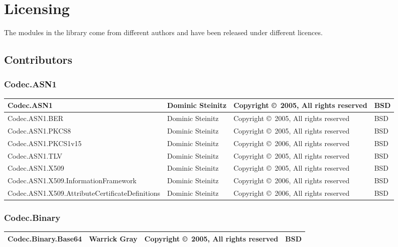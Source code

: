 \documentclass{article}
\begin{document}
\section{Licensing}

The modules in the library come from different authors and have been 
released under different licences. 

\subsection{Contributors}

\subsubsection{Codec.ASN1}
\begin{tabular}{|p{6cm}|p{3cm}|p{3cm}|p{1cm}|}
\hline\hline
Codec.ASN1 & Dominic Steinitz & 
Copyright \copyright\ 2005, All rights reserved & BSD \\
\hline
Codec.ASN1.BER & Dominic Steinitz & 
Copyright \copyright\ 2005, All rights reserved & BSD \\
\hline
Codec.ASN1.PKCS8 & Dominic Steinitz & 
Copyright \copyright\ 2005, All rights reserved & BSD \\
\hline
Codec.ASN1.PKCS1v15 & Dominic Steinitz & 
Copyright \copyright\ 2006, All rights reserved & BSD \\
\hline
Codec.ASN1.TLV & Dominic Steinitz & 
Copyright \copyright\ 2005, All rights reserved & BSD \\
\hline
Codec.ASN1.X509 & Dominic Steinitz & 
Copyright \copyright\ 2005, All rights reserved & BSD \\
\hline
Codec.ASN1.X509.Information\-Framework
& Dominic Steinitz &
Copyright \copyright\ 2006, All rights reserved & BSD \\
\hline
Codec.ASN1.X509.Attribute\-Certificate\-Definitions
& Dominic Steinitz &
Copyright \copyright\ 2006, All rights reserved & BSD \\
\hline\hline
\end{tabular}

\subsubsection{Codec.Binary}
\begin{tabular}{|p{6cm}|p{3cm}|p{3cm}|p{1cm}|}
\hline\hline
Codec.Binary.Base64 & Warrick Gray & 
Copyright \copyright\ 2005, All rights reserved & BSD \\
\hline\hline
\end{tabular}
\end{document}
